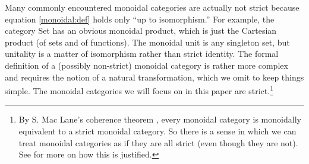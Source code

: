 \documentclass[12pt]{amsart}
\theoremstyle{plain}
\theoremstyle{definition}
\theoremstyle{remark}
\numberwithin{equation}{section}
\theoremstyle{plain}
\newcommand{\0}{\emptyset}
\newcommand{\cat}[1]{\textup{\textsf{#1}}}
\begin{document}
Many commonly encountered monoidal categories are actually not strict because equation \ref{monoidal:def} holds only ``up to isomorphism.'' For example, the category \cat{Set} has an obvious monoidal product, which is just the Cartesian product (of sets and of functions). The monoidal unit is any singleton set, but unitality is a matter of isomorphism rather than strict identity. The formal definition of a (possibly non-strict) monoidal category is rather more complex and requires the notion of a natural transformation, which we omit to keep things simple. The monoidal categories we will focus on in this paper are strict.\footnote{By S. Mac Lane's coherence theorem \cite[Theorem XI.3.1]{MacLane1998}, every monoidal category is monoidally equivalent to a strict
monoidal category. So there is a sense in which we can treat monoidal categories as if they are all strict (even though they are not). See \cite{selinger2010survey} for more on how this is justified.}
\end{document}
